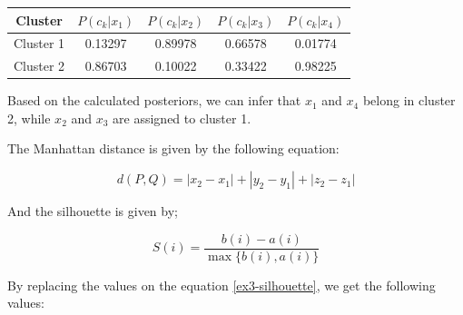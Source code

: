 \documentclass[12pt]{article}
\begin{document}
\begin{enumerate}[leftmargin=\labelsep]
          \begin{center}
            \captionsetup{type=table}
            \begin{tabular}{c|cccc}
                Cluster & $P(c_k | x_1)$ & $P(c_k | x_2)$& $P(c_k | x_3)$ & $P(c_k | x_4)$                            \\
                \hline
                \colorbox{bmint}{Cluster 1}                                               &
                0.13297                                                                   &
                0.89978                                                                   &
                0.66578                                                                   &
                0.01774                                                                  \\
                \colorbox{byellow}{Cluster 2}                                             &
                0.86703                                                                   &
                0.10022                                                                   &
                0.33422                                                                   &
                0.98225                                                                  \\
            \end{tabular}
          \end{center}

          Based on the calculated posteriors, we can infer that $x_1$ and $x_4$ belong in cluster 2, while $x_2$ and $x_3$ are assigned to cluster 1.

          The Manhattan distance is given by the following equation:

          \begin{equation}\label{ex3-manhattan}
            d(P, Q) = |x_2 - x_1| + |y_2 - y_1| + |z_2 - z_1|
          \end{equation}

          And the silhouette is given by;

          \begin{equation}\label{ex3-silhouette}
            S(i) = \frac{b(i) - a(i)}{\max\{b(i), a(i)\}}
          \end{equation}

          By replacing the values on the equation \eqref{ex3-silhouette}, we get the following values:


\end{enumerate}
\end{document}
